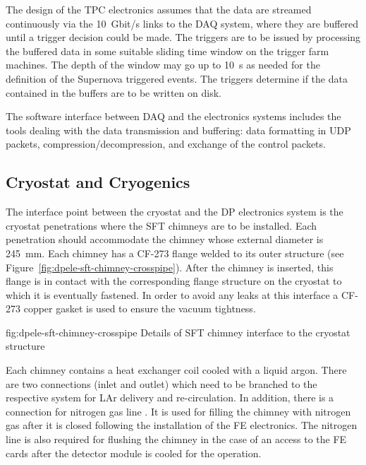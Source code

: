 The design of the TPC electronics assumes that the data are streamed continuously via the \SI{10}{Gbit/s} links to the DAQ system, where they are buffered until a trigger decision could be made. The triggers are to be issued by processing the buffered data in some suitable sliding time window on the trigger farm machines. The depth of the window may go up to \SI{10}{s} as needed for the definition of the Supernova triggered events. The triggers determine if the data contained in the buffers are to be written on disk. 

The software interface between DAQ and the electronics systems includes the tools dealing with the data transmission and buffering: data formatting in UDP packets, compression/decompression, and exchange of the control packets.

\subsection{Cryostat and Cryogenics}
\label{sec:fddp-tpc-elec-intfc-cryo}

The interface point between the cryostat and the DP electronics system is the cryostat penetrations where the SFT chimneys are to be installed. Each penetration should accommodate the chimney whose external diameter is \SI{245}{\mm}. Each chimney has a CF-273 flange welded to its outer structure (see Figure~\ref{fig:dpele-sft-chimney-crosspipe}). After the chimney is inserted, this flange is in contact with the corresponding flange structure on the cryostat to which it is eventually fastened. In order to avoid any leaks at this interface a CF-273 copper gasket is used to ensure the vacuum tightness.  

\begin{dunefigure}{fig:dpele-sft-chimney-crosspipe}
{Details of SFT chimney interface to the cryostat structure}
\end{dunefigure}

Each chimney contains a heat exchanger coil cooled with a liquid argon. There are two  connections (inlet and outlet) which need to be branched to the respective system for LAr delivery and re-circulation. In addition, there is a connection for nitrogen gas line . It is used for filling the chimney with nitrogen gas after it is closed following the installation of the FE electronics. The nitrogen line is also required for flushing the chimney in the case of an access to the FE cards after the detector module is cooled for the operation. 

